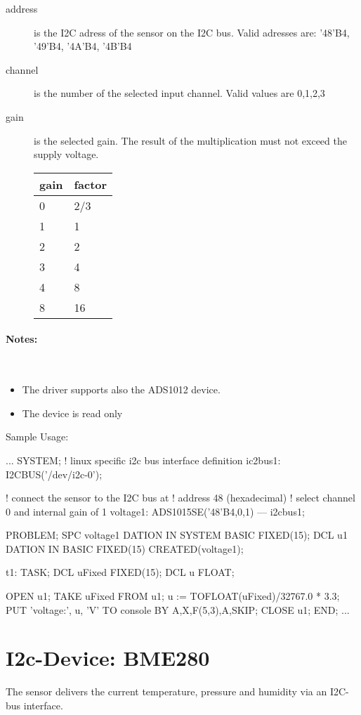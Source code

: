 \begin{description}
\item[address] is the I2C adress of the sensor on the I2C bus.
   Valid adresses are: '48'B4, '49'B4, '4A'B4, '4B'B4
\item[channel] is the number of the selected input channel. 
   Valid values are 0,1,2,3
\item[gain] is the selected gain.
   The result of the multiplication must not exceed the supply voltage.

  \begin{tabular}{l|l}
   gain & factor\\
   \hline 
   0 & 2/3 \\
   1 & 1 \\
   2 & 2 \\
   3 & 4 \\
   4 & 8 \\
   8 & 16 \\
   \end{tabular} 

\end{description}

\paragraph{Notes:} \ 
\begin{itemize}
\item The driver supports also the ADS1012 device.
\item The device is read only
\end{itemize}

Sample Usage:
\begin{PEARLCode}
...
SYSTEM;
   ! linux specific i2c bus interface definition
   ic2bus1: I2CBUS('/dev/i2c-0');

   ! connect the sensor to the I2C bus at 
   ! address 48 (hexadecimal)
   ! select channel 0 and internal gain of 1
   voltage1: ADS1015SE('48'B4,0,1) --- i2cbus1;

PROBLEM;
   SPC voltage1 DATION IN SYSTEM BASIC FIXED(15);
   DCL u1 DATION IN BASIC FIXED(15) CREATED(voltage1);

t1: TASK;
   DCL uFixed FIXED(15);
   DCL u FLOAT;
 
   OPEN u1;
   TAKE uFixed FROM u1;
   u := TOFLOAT(uFixed)/32767.0 * 3.3;
   PUT 'voltage:', u, 'V' TO console BY A,X,F(5,3),A,SKIP;
   CLOSE u1;
END;
...
\end{PEARLCode}


\section{I2c-Device: BME280}
The sensor delivers the current temperature, pressure and humidity
 via an I2C-bus interface.

